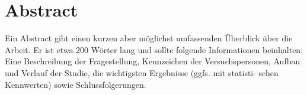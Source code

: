 
\section*{Abstract}

\noindent 
{}
Ein Abstract gibt einen kurzen aber möglichst umfassenden Überblick über die Arbeit. Er ist etwa 200 Wörter lang und sollte folgende Informationen beinhalten: Eine Beschreibung der Fragestellung, Kennzeichen der Versuchspersonen, Aufbau und Verlauf der Studie, die wichtigsten Ergebnisse (ggfs. mit statisti- schen Kennwerten) sowie Schlussfolgerungen.

\newpage